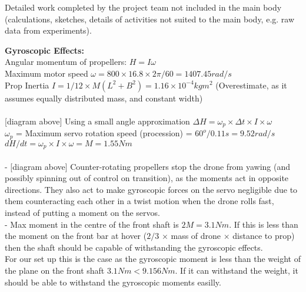\color{red}
Detailed work completed by the project team not included in the main body (calculations, sketches, details of activities not suited to the main body, e.g. raw data from experiments).
\color{black}

\textbf{Gyroscopic Effects:}\\

Angular momentum of propellers: $H = I\omega$\\
Maximum motor speed $\omega = 800\times16.8\times2\pi/60 = 1407.45rad/s$\\
Prop Inertia $I = 1/12\times M(L^2+B^2) = 1.16\times10^{-4}kgm^2$ (Overestimate, as it assumes equally distributed mass, and constant width)\\\\

[diagram above] Using a small angle approximation $\Delta H = \omega_p \times\Delta t \times I \times \omega$\\ 
$\omega_p$ = Maximum servo rotation speed (procession) = $60^o/0.11s = 9.52rad/s$\\
$dH/dt = \omega_p \times I \times \omega = M = 1.55Nm$\\\\

- [diagram above] Counter-rotating propellers stop the drone from yawing (and possibly spinning out of control on transition), as the moments act in opposite directions. They also act to make gyroscopic forces on the servo negligible due to them counteracting each other in a twist motion when the drone rolls fast, instead of putting a moment on the servos.\\
- Max moment in the centre of the front shaft is $2M = 3.1Nm$. If this is less than the moment on the front bar at hover ($2/3$ $\times $ mass of drone $\times$ distance to prop) then the shaft should be capable of withstanding the gyroscopic effects.\\
For our set up this is the case as the gyroscopic moment is less than the weight of the plane on the front shaft $3.1Nm < 9.156Nm$. If it can withstand the weight, it should be able to withstand the gyroscopic moments easilly.


